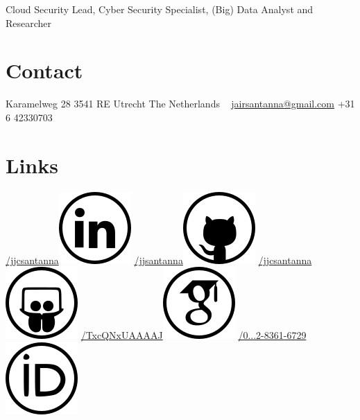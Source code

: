 \documentclass[print]{styles/friggeri-cv-linux} %
\begin{document}
{Cloud Security Lead, Cyber Security Specialist, (Big) Data Analyst and Researcher} 
\begin{aside} 
 \section{Contact}
 Karamelweg 28
 3541 RE Utrecht
 The Netherlands
~
\href{mailto:jairsantanna@gmail.com}{jairsantanna@gmail.com}
+31 6 42330703
~
\section{Links}\hspace{-1cm}
\hspace{-0.5cm}
\href{https://www.linkedin.com/in/jjcsantanna}{/jjcsantanna}\includegraphics[scale=0.3]{img/linkedin.png}
\href{https://github.com/jjsantanna}{/jjsantanna\includegraphics[scale=0.3]{img/github.png}}
\href{http://www.slideshare.net/jjcsantanna}{/jjcsantanna}\includegraphics[scale=0.3]{img/slideshare.png}
\href{https://scholar.google.com/citations?user=TxcQNxUAAAAJ}{/TxcQNxUAAAAJ}\includegraphics[scale=0.3]{img/googlescholar.png}
\href{http://orcid.org/0000-0002-8361-6729}{/0...2-8361-6729}\includegraphics[scale=0.3]{img/orcid.png}

\end{aside}
\end{document}
